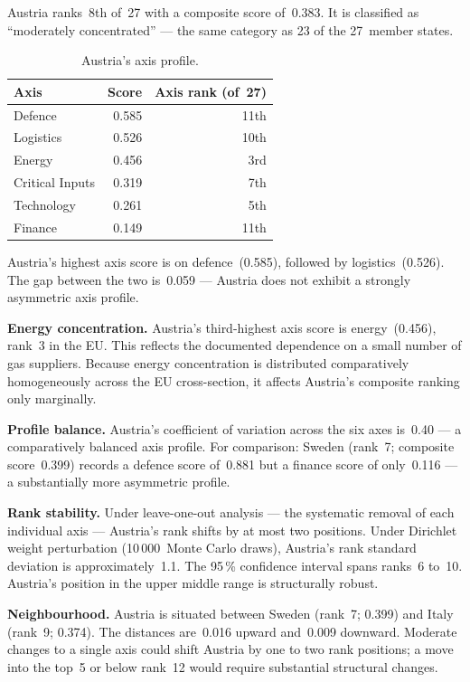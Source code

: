 Austria ranks~8th of~27 with a composite score of~0.383.  It is
classified as ``moderately concentrated'' --- the same category as
23 of the 27~member states.

\begin{table}[htbp]
\centering\small
\caption{Austria's axis profile.}
\label{tab:austria}
\begin{tabular}{@{}lrr@{}}
\toprule
\textbf{Axis} & \textbf{Score} & \textbf{Axis rank (of~27)} \\
\midrule
Defence            & 0.585 & 11th \\
Logistics          & 0.526 & 10th \\
Energy             & 0.456 &  3rd \\
Critical Inputs    & 0.319 &  7th \\
Technology         & 0.261 &  5th \\
Finance            & 0.149 & 11th \\
\bottomrule
\end{tabular}
\end{table}

Austria's highest axis score is on defence~(0.585), followed by
logistics~(0.526).  The gap between the two is~0.059 --- Austria
does not exhibit a strongly asymmetric axis profile.

\textbf{Energy concentration.}
Austria's third-highest axis score is energy~(0.456), rank~3 in
the EU.  This reflects the documented dependence on a small number
of gas suppliers.  Because energy concentration is distributed
comparatively homogeneously across the EU cross-section, it
affects Austria's composite ranking only marginally.

\textbf{Profile balance.}
Austria's coefficient of variation across the six axes is~0.40 ---
a comparatively balanced axis profile.  For comparison:
Sweden (rank~7; composite score~0.399) records a defence score
of~0.881 but a finance score of only~0.116 --- a substantially
more asymmetric profile.

\textbf{Rank stability.}
Under leave-one-out analysis --- the systematic removal of each
individual axis --- Austria's rank shifts by at most two positions.
Under Dirichlet weight perturbation (10\,000~Monte Carlo draws),
Austria's rank standard deviation is approximately~1.1.  The
95\,\% confidence interval spans ranks~6 to~10.  Austria's
position in the upper middle range is structurally robust.

\textbf{Neighbourhood.}
Austria is situated between Sweden (rank~7; 0.399) and
Italy (rank~9; 0.374).  The distances are~0.016 upward
and~0.009 downward.  Moderate changes to a single axis could
shift Austria by one to two rank positions; a move into the top~5
or below rank~12 would require substantial structural changes.


